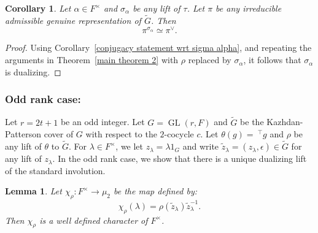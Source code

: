 \documentclass[11pt, a4paper, reqno]{amsart}
\newtheorem{lemma}[theorem]{Lemma}
\newtheorem{corollary}[theorem]{Corollary}
\theoremstyle{definition}
\theoremstyle{remark}
\theoremstyle{example}
\theoremstyle{note}
\numberwithin{equation}{section}
\DeclareMathOperator{\GL}{GL}
\begin{document}
\begin{corollary} Let $\alpha \in F^{\times}$ and $\sigma_{\alpha}$ be any lift of $\tau$. Let $\pi$ be any irreducible admissible genuine representation of $\widetilde{G}$. Then 
\[\pi^{\sigma_{\alpha}}\simeq \pi^{\vee}. \]
\end{corollary}

\begin{proof} Using Corollary~\ref{conjugacy statement wrt sigma alpha}, and repeating the arguments in Theorem~\ref{main theorem 2} with $\rho$ replaced by $\sigma_{\alpha}$, it follows that $\sigma_{\alpha}$ is dualizing. 
\end{proof}




\subsubsection{Odd rank case:} \label{Odd rank case}

Let $r=2t+1$ be an odd integer. Let $G=\GL(r,F)$ and $\widetilde{G}$ be the Kazhdan-Patterson cover of $G$ with respect to the $2$-cocycle $c$. Let $\theta(g)=~^{\top}g$ and $\rho$ be any lift of $\theta$ to $\widetilde{G}$. For $\lambda\in F^{\times}$, we let $z_{\lambda}=\lambda1_{G}$ and write $\tilde{z}_{\lambda}=(z_{\lambda}, \epsilon) \in \widetilde{G}$ for any lift of $z_{\lambda}$. In the odd rank case, we show that there is a unique dualizing lift of the standard involution. 


\begin{lemma}\label{definition of chirho} Let $\chi_{\rho}: F^{\times} \rightarrow \mu_{2}$ be the map defined by:
\[\chi_{\rho}(\lambda)= \rho(\tilde{z}_{\lambda})\tilde{z}_{\lambda}^{-1}. \]
Then $\chi_{\rho}$ is a well defined character of $F^{\times}$. 
\end{lemma}
\end{document}

